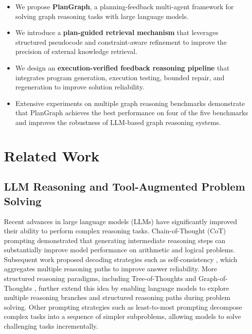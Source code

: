 \documentclass[sigconf,review,anonymous]{acmart}
\begin{document}
\begin{itemize}[topsep=2pt,itemsep=2pt]

\item We propose \textbf{PlanGraph}, a planning-feedback multi-agent framework for solving graph reasoning tasks with large language models.

\item We introduce a \textbf{plan-guided retrieval mechanism} that leverages structured pseudocode and constraint-aware refinement to improve the precision of external knowledge retrieval.

\item We design an \textbf{execution-verified feedback reasoning pipeline} that integrates program generation, execution testing, bounded repair, and regeneration to improve solution reliability.

\item Extensive experiments on multiple graph reasoning benchmarks demonstrate that PlanGraph achieves the best performance on four of the five benchmarks and improves the robustness of LLM-based graph reasoning systems.

\end{itemize}

\section{Related Work}

\subsection{LLM Reasoning and Tool-Augmented Problem Solving}

Recent advances in large language models (LLMs) have significantly improved their ability to perform complex reasoning tasks. 
Chain-of-Thought (CoT) prompting \cite{wei2022chain} demonstrated that generating intermediate reasoning steps can substantially improve model performance on arithmetic and logical problems. 
Subsequent work proposed decoding strategies such as self-consistency \cite{wang2023selfconsistency}, which aggregates multiple reasoning paths to improve answer reliability. 
More structured reasoning paradigms, including Tree-of-Thoughts \cite{yao2023tree} and Graph-of-Thoughts \cite{besta2024graph}, further extend this idea by enabling language models to explore multiple reasoning branches and structured reasoning paths during problem solving. 
Other prompting strategies such as least-to-most prompting \cite{zhou2023least} decompose complex tasks into a sequence of simpler subproblems, allowing models to solve challenging tasks incrementally.
\end{document}
